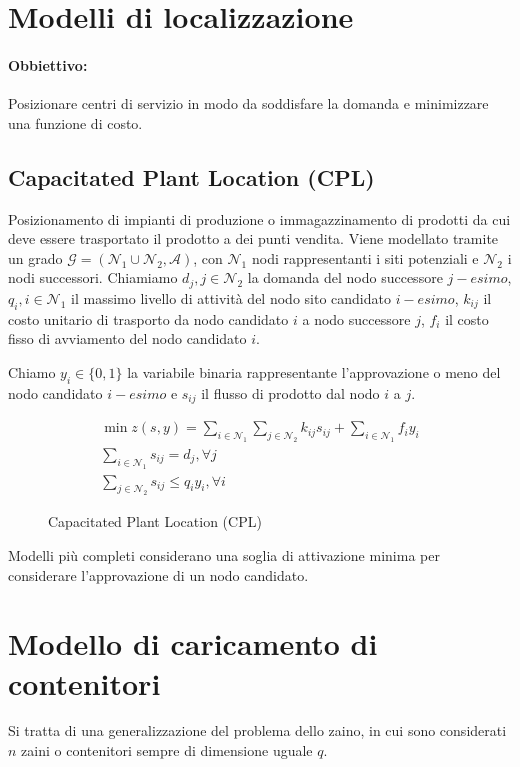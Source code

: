 \documentclass[\main/main.tex]{subfiles}
\begin{document}
\section{Modelli di localizzazione}
\paragraph*{Obbiettivo:} Posizionare centri di servizio in modo da soddisfare la domanda e minimizzare una funzione di costo.

\subsection{Capacitated Plant Location (CPL)}
Posizionamento di impianti di produzione o immagazzinamento di prodotti da cui deve essere trasportato il prodotto a dei punti vendita. Viene modellato tramite un grado $\mathcal{G} = (\mathcal{N}_1 \cup \mathcal{N}_2, \mathcal{A})$, con $\mathcal{N}_1$ nodi rappresentanti i siti potenziali e $\mathcal{N}_2$ i nodi successori.
Chiamiamo $d_j, j \in \mathcal{N}_2$ la domanda del nodo successore $j-esimo$, $q_i, i \in \mathcal{N}_1$ il massimo livello di attività del nodo sito candidato $i-esimo$, $k_{ij}$ il costo unitario di trasporto da nodo candidato $i$ a nodo successore $j$, $f_i$ il costo fisso di avviamento del nodo candidato $i$.

Chiamo $y_i \in \{0,1\}$ la variabile binaria rappresentante l'approvazione o meno del nodo candidato $i-esimo$ e $s_{ij}$ il flusso di prodotto dal nodo $i$ a $j$.

\begin{figure}
  \begin{align*}
    \min z(s,y) = \sum_{i \in \mathcal{N}_1} \sum_{j \in \mathcal{N}_2} k_{ij}s_{ij} + \sum_{i \in \mathcal{N}_1} f_i y_i \\
    \sum_{i \in \mathcal{N}_1} s_{ij} = d_j, \forall j                                                                    \\
    \sum_{j \in \mathcal{N}_2} s_{ij} \leq q_iy_i, \forall i
  \end{align*}
  \caption{Capacitated Plant Location (CPL)}
\end{figure}

Modelli più completi considerano una soglia di attivazione minima per considerare l'approvazione di un nodo candidato.

\section{Modello di caricamento di contenitori}
Si tratta di una generalizzazione del problema dello zaino, in cui sono considerati $n$ zaini o contenitori sempre di dimensione uguale $q$.
\end{document}
